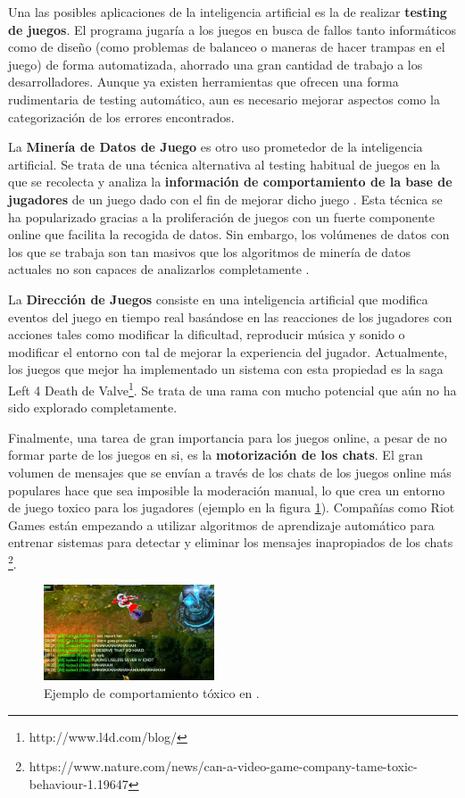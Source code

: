 Una las posibles aplicaciones de la inteligencia artificial es la de realizar \textbf{testing de juegos}. El programa jugaría a los juegos en busca de fallos tanto informáticos como de diseño (como problemas de balanceo o maneras de hacer trampas en el juego) de forma automatizada, ahorrado una gran cantidad de trabajo a los desarrolladores. Aunque ya existen herramientas que ofrecen una forma rudimentaria de testing automático, aun es necesario mejorar aspectos como la categorización de los errores encontrados.

La \textbf{Minería de Datos de Juego} es otro uso prometedor de la inteligencia artificial. Se trata de una técnica alternativa al testing habitual de juegos en la que se recolecta y analiza la \textbf{información de comportamiento de la base de jugadores} de un juego dado con el fin de mejorar dicho juego \cite{ai_revisited}. Esta técnica se ha popularizado gracias a la proliferación de juegos con un fuerte componente online que facilita la recogida de datos. Sin embargo, los volúmenes de datos con los que se trabaja son tan masivos que los algoritmos de minería de datos actuales no son capaces de analizarlos completamente \cite{ai_revisited}.

La \textbf{Dirección de Juegos} consiste en una inteligencia artificial que modifica eventos del juego en tiempo real basándose en las reacciones de los jugadores con acciones tales como modificar la dificultad, reproducir música y sonido o modificar el entorno con tal de mejorar la experiencia del jugador. Actualmente, los juegos que mejor ha implementado un sistema con esta propiedad es la saga Left 4 Death de Valve\footnote{http://www.l4d.com/blog/}. Se trata de una rama con mucho potencial que aún no ha sido explorado completamente.

Finalmente, una tarea de gran importancia para los juegos online, a pesar de no formar parte de los juegos en si, es la \textbf{motorización de los chats}. El gran volumen de mensajes que se envían a través de los chats de los juegos online más populares hace que sea imposible la moderación manual, lo que crea un entorno de juego toxico para los jugadores (ejemplo en la figura \ref{lol-toxic-capture}). Compañías como Riot Games están empezando a utilizar algoritmos de aprendizaje automático para entrenar sistemas para detectar y eliminar los mensajes inapropiados de los chats \footnote{https://www.nature.com/news/can-a-video-game-company-tame-toxic-behaviour-1.19647}.

\begin{figure}[h]
	\includegraphics[width=0.45\textwidth]{images/estadodelarte/ai/lol-toxic-capture}
	\centering
	\caption{Ejemplo de comportamiento tóxico en .}
	\label{lol-toxic-capture}
\end{figure}
